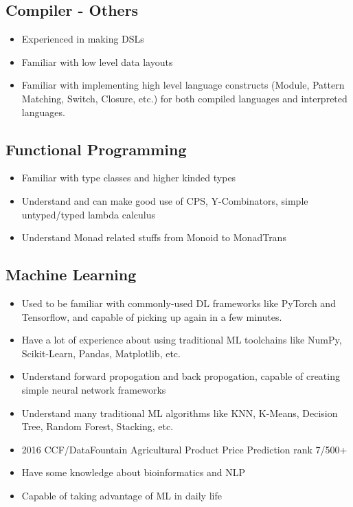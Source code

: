 \documentclass{resume}
\begin{document}
\subsection{\textbf{Compiler - Others}}
\begin{itemize}
  \item Experienced in making DSLs
  \item Familiar with low level data layouts
  \item Familiar with implementing high level language constructs
        (Module, Pattern Matching, Switch, Closure, etc.) for both
        compiled languages and interpreted languages.
\end{itemize}

\subsection{\textbf{Functional Programming}}
\begin{itemize}
  \item Familiar with type classes and higher kinded types
  \item Understand and can make good use of CPS, Y-Combinators, simple untyped/typed lambda calculus
  \item Understand Monad related stuffs from Monoid to MonadTrans
\end{itemize}

\subsection{\textbf{Machine Learning}}
\begin{itemize}
  \item Used to be familiar with commonly-used DL frameworks like PyTorch and Tensorflow, and capable of picking up again in a few minutes.
  \item Have a lot of experience about using traditional ML toolchains like NumPy, Scikit-Learn, Pandas, Matplotlib, etc.
  \item Understand forward propogation and back propogation, capable of creating simple neural network frameworks
  \item Understand many traditional ML algorithms like KNN, K-Means, Decision Tree, Random Forest, Stacking, etc.
  \item 2016 CCF/DataFountain Agricultural Product Price Prediction rank 7/500+
  \item Have some knowledge about bioinformatics and NLP
  \item Capable of taking advantage of ML in daily life
\end{itemize}
\end{document}
